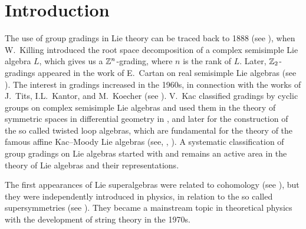\chapter*{Introduction}\label{chap:intro}

The use of group gradings in Lie theory can be traced back to 1888 (see \cite{MR1510529}), when W.~Killing introduced the root space decomposition of a complex semisimple Lie algebra $L$, which gives us a $\mathbb{Z}^n$-grading, where $n$ is the rank of $L$.  
Later, $\mathbb{Z}_2$-gradings appeared in the work of E.~Cartan on real semisimple Lie algebras (see \cite{Cartan-1914}). 
The interest in gradings increased in the 1960s, in connection with the works of J.~Tits, I.L.~Kantor, and M.~Koecher (see \cite{Tit62,Kan64,Koe67}). 
V.~Kac classified gradings by cyclic groups on complex semisimple Lie algebras and used them in the theory of symmetric spaces in differential geometry in \cite{Kac68}, and later for the construction of the so called twisted loop algebras, which are fundamental for the theory of the famous affine Kac--Moody Lie algebras (see, \eg, \cite{Kac90}). 
A systematic classification of group gradings on Lie algebras started with \cite{PZ} and remains an active area in the theory of Lie algebras and their representations.

The first appearances of Lie superalgebras were related to cohomology (see \cite{FN56,Gen63,Gen64,MM65}), but they were independently introduced in physics, in relation to the so called supersymmetries (see \cite{GN64,Miy68,Mic69}). 
They became a mainstream topic in theoretical physics with the development of string theory in the 1970s. 

